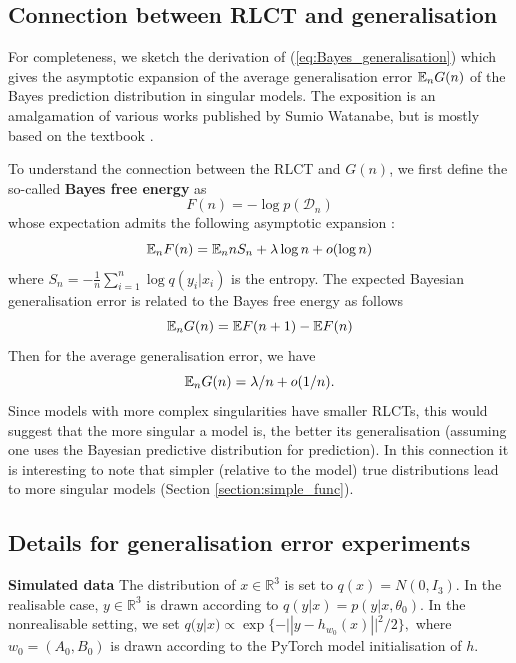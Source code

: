 \documentclass{article} %
\begin{document}
\subsection{Connection between RLCT and generalisation} \label{appendix:generalisation_theory}
For completeness, we sketch the derivation of (\ref{eq:Bayes_generalisation}) which gives the asymptotic expansion of the average generalisation error ${\mathbb{E}}_n G(n)$ of the Bayes prediction distribution  in singular models. The exposition is an amalgamation of various works published by Sumio Watanabe, but is mostly based on the textbook \citep{watanabe_algebraic_2009}. 

To understand the connection between the RLCT and $G(n)$, we first define the so-called \textbf{Bayes free energy} as 
\[
F(n) = -\log p(\mathcal D_n)
\]
whose expectation admits the following asymptotic expansion \citep{watanabe_algebraic_2009}:
\[
{\mathbb{E}}_n F(n) =  {\mathbb{E}}_n n S_n + \lambda \log n + o(\log n)
\]
where $S_n = -\frac{1}{n} \sum_{i=1}^n \log q(y_i|x_i)$ is the entropy. 
The expected Bayesian generalisation error is related to the Bayes free energy as follows
\[
{\mathbb{E}}_n G(n) = \mathbb{E} F(n+1) - \mathbb{E} F(n)
\]
Then for the average generalisation error, we have
\begin{equation}
{\mathbb{E}}_n G(n) = \lambda/n + o(1/n).
\label{eq:bayesgenerr}
\end{equation}
Since models with more complex singularities have smaller RLCTs, this would suggest that the more singular a model is, the better its generalisation (assuming one uses the Bayesian predictive distribution for prediction). In this connection it is interesting to note that simpler (relative to the model) true distributions lead to more singular models (Section \ref{section:simple_func}).


\subsection{Details for generalisation error experiments}
\label{appendix:generalizaton}

\textbf{Simulated data}
The distribution of $x \in \mathbb R^3$ is set to $q(x)=N(0,I_3)$. 
In the realisable case, $y \in \mathbb R^3$ is drawn according to $q(y|x) = p(y|x,\theta_0)$. In the nonrealisable setting, we set $q(y|x) \propto \exp\{-|| y - h_{w_0}(x) ||^2/2\},$ where $w_0 = (A_0,B_0)$ is drawn according to the PyTorch model initialisation of $h$.
\end{document}

